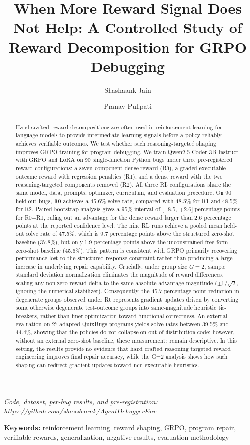 \documentclass{article}
\title{When More Reward Signal Does Not Help: A Controlled Study of Reward Decomposition for GRPO Debugging}
\author{Shashaank Jain \and Pranav Pulipati}
\begin{document}
\maketitle

\begin{center}
\textit{Code, dataset, per-bug results, and pre-registration: \url{https://github.com/shasshaank/AgentDebuggerEnv}}
\end{center}

\vspace{0.3cm}
\noindent \textbf{Keywords:} reinforcement learning, reward shaping, GRPO, program repair, verifiable rewards, generalization, negative results, evaluation methodology
\vspace{0.3cm}

\begin{abstract}
Hand-crafted reward decompositions are often used in reinforcement learning for language models to provide intermediate learning signals before a policy reliably achieves verifiable outcomes. We test whether such reasoning-targeted shaping improves GRPO training for program debugging. We train Qwen2.5-Coder-3B-Instruct with GRPO and LoRA on 90 single-function Python bugs under three pre-registered reward configurations: a seven-component dense reward (R0), a graded executable outcome reward with regression penalties (R1), and a dense reward with the two reasoning-targeted components removed (R2). All three RL configurations share the same model, data, prompts, optimizer, curriculum, and evaluation procedure. On 90 held-out bugs, R0 achieves a 45.6\% solve rate, compared with 48.5\% for R1 and 48.5\% for R2. Paired bootstrap analysis gives a 95\% interval of [$-$8.5, $+$2.6] percentage points for R0$-$R1, ruling out an advantage for the dense reward larger than 2.6 percentage points at the reported confidence level. The nine RL runs achieve a pooled mean held-out solve rate of 47.5\%, which is 9.7 percentage points above the structured zero-shot baseline (37.8\%), but only 1.9 percentage points above the unconstrained free-form zero-shot baseline (45.6\%). This pattern is consistent with GRPO primarily recovering performance lost to the structured-response constraint rather than producing a large increase in underlying repair capability. Crucially, under group size $G=2$, sample standard deviation normalization eliminates the magnitude of reward differences, scaling any non-zero reward delta to the same absolute advantage magnitude ($\pm 1/\sqrt{2}$, ignoring the numerical stabilizer). Consequently, the 45.7 percentage point reduction in degenerate groups observed under R0 represents gradient updates driven by converting some otherwise degenerate test-outcome groups into same-magnitude heuristic tie-breakers, rather than finer optimization toward functional correctness. An external evaluation on 27 adapted QuixBugs programs yields solve rates between 39.5\% and 44.4\%, showing that the policies do not collapse on out-of-distribution code; however, without an external zero-shot baseline, these measurements remain descriptive. In this setting, the results provide no evidence that hand-crafted reasoning-targeted reward engineering improves final repair accuracy, while the G=2 analysis shows how such shaping can redirect gradient updates toward non-executable heuristics.

\end{abstract}
\end{document}
